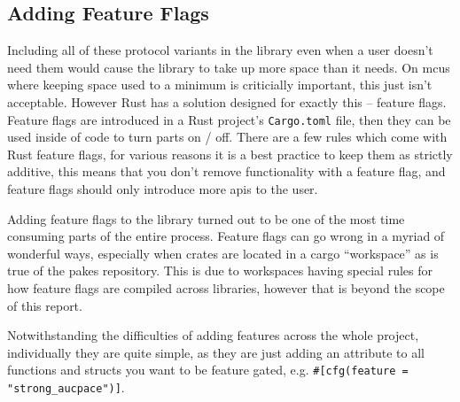 \subsection{Adding Feature Flags}
Including all of these protocol variants in the library even when a user doesn't need them would cause the library to take up more space than it needs.
On \glspl{mcu} where keeping space used to a minimum is criticially important, this just isn't acceptable.
However Rust has a solution designed for exactly this -- feature flags.
Feature flags are introduced in a Rust project's \texttt{Cargo.toml} file, then they can be used inside of code to turn parts on / off.
There are a few rules which come with Rust feature flags, for various reasons it is a best practice to keep them as strictly additive, this means that you don't remove functionality with a feature flag, and feature flags should only introduce more \glspl{api} to the user.

Adding feature flags to the library turned out to be one of the most time consuming parts of the entire process.
Feature flags can go wrong in a myriad of wonderful ways, especially when crates are located in a cargo \enquote{workspace} as is true of the \glspl{pake} repository.
This is due to workspaces having special rules for how feature flags are compiled across libraries, however that is beyond the scope of this report.

Notwithstanding the difficulties of adding features across the whole project, individually they are quite simple, as they are just adding an attribute to all functions and structs you want to be feature gated, e.g. \verb|#[cfg(feature = "strong_aucpace")]|.

